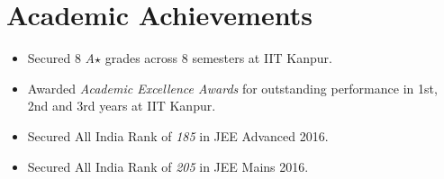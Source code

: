 \section*{Academic Achievements}
\begin{itemize}[itemsep=0mm]

\item Secured 8 \textit{A$\star$} grades across 8 semesters at IIT Kanpur.
\item Awarded \textit{Academic Excellence Awards} for outstanding performance in 1st, 2nd and 3rd years at IIT Kanpur.
\item Secured All India Rank of \textit{185} in JEE Advanced 2016.
\item Secured All India Rank of \textit{205} in JEE Mains 2016.

\end{itemize}
